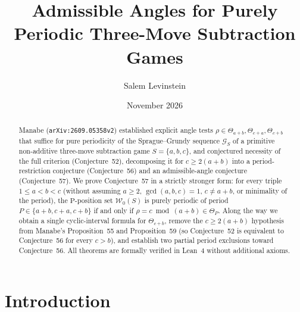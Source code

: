\documentclass[11pt]{article}
\title{Admissible Angles for Purely Periodic Three-Move Subtraction Games}
\author{Salem Levinstein}
\date{November 2026}
\theoremstyle{remark}
\begin{document}
\maketitle

\begin{abstract}
Manabe (\texttt{arXiv:2609.05358v2}) established explicit angle tests $\rho \in \Theta_{a+b}, \Theta_{c+a}, \Theta_{c+b}$ that suffice for pure periodicity of the Sprague--Grundy sequence $\mathcal{G}_S$ of a primitive non-additive three-move subtraction game $S = \{a, b, c\}$, and conjectured necessity of the full criterion (Conjecture~52), decomposing it for $c \ge 2(a+b)$ into a period-restriction conjecture (Conjecture~56) and an admissible-angle conjecture (Conjecture~57). We prove Conjecture~57 in a strictly stronger form: for every triple $1 \le a < b < c$ (without assuming $a \ge 2$, $\gcd(a,b,c)=1$, $c \neq a+b$, or minimality of the period), the $\mathrm{P}$-position set $\mathcal{W}_0(S)$ is purely periodic of period $P \in \{a+b, c+a, c+b\}$ if and only if $\rho = c \bmod (a+b) \in \Theta_P$. Along the way we obtain a single cyclic-interval formula for $\Theta_{c+b}$, remove the $c \ge 2(a+b)$ hypothesis from Manabe's Proposition~55 and Proposition~59 (so Conjecture~52 is equivalent to Conjecture~56 for every $c > b$), and establish two partial period exclusions toward Conjecture~56. All theorems are formally verified in Lean~4 without additional axioms.
\end{abstract}

\section{Introduction}
\end{document}
